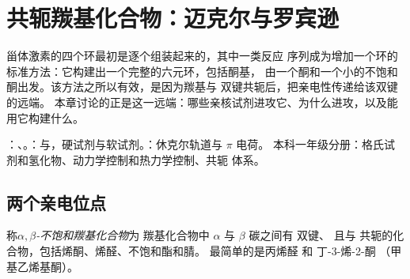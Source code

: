 \chapter{共轭羰基化合物：迈克尔与罗宾逊}\label{ch:b2:conjugate-additions}

甾体激素的四个环最初是逐个组装起来的，其中一类反应
序列成为增加一个环的标准方法：它构建出一个完整的六元环，包括酮基，
由一个酮和一个小的不饱和酮出发。该方法之所以有效，是因为羰基与
 双键共轭后，把亲电性传递给该双键的远端。
本章讨论的正是这一远端：哪些亲核试剂进攻它、为什么进攻，以及能用它构建什么。

\begin{recall}
：、。：与，硬试剂与软试剂。：休克尔轨道与 $\pi$ 电荷。
本科一年级分册：格氏试剂和氢化物、动力学控制和热力学控制、共轭
体系。
\end{recall}

\section{两个亲电位点}

\begin{definition}\label{def:b2:conjugate-additions:enone}
称\emph{$\alpha,\beta$-不饱和羰基化合物}为
羰基化合物中 $\alpha$ 与 $\beta$ 碳之间有  双键、
且与  共轭的化合物，包括烯酮、烯醛、不饱和酯和腈。
最简单的是丙烯醛  和
丁-3-烯-2-酮 （甲基乙烯基酮）。
\end{definition}

